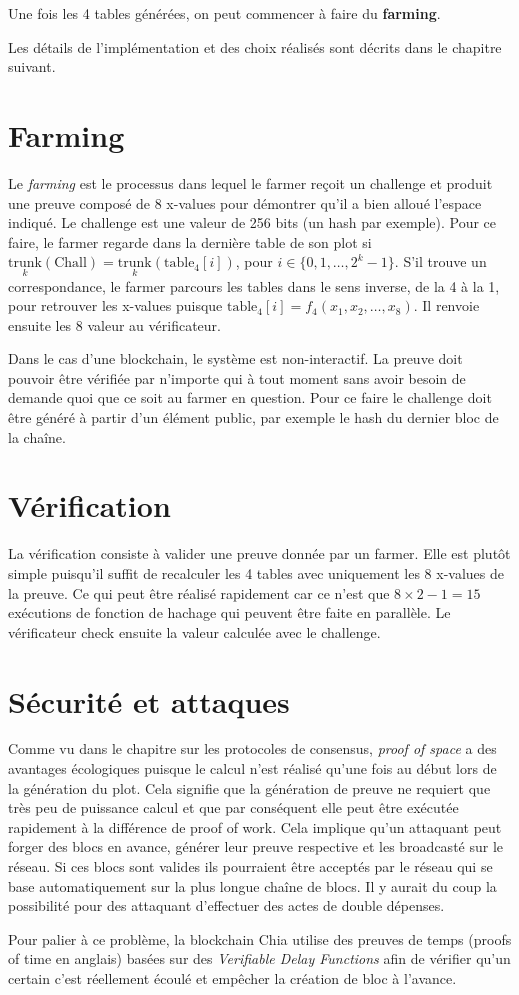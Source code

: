 \documentclass[../tb_report.tex]{subfiles}
\begin{document}
Une fois les 4 tables générées, on peut commencer à faire du \textbf{farming}.

Les détails de l'implémentation et des choix réalisés sont décrits dans le chapitre suivant.

\section{Farming}

Le \emph{farming} est le processus dans lequel le farmer reçoit un challenge et produit une preuve composé de 8 x-values pour démontrer qu'il a bien alloué l'espace indiqué. Le challenge est une valeur de 256 bits (un hash par exemple). Pour ce faire, le farmer regarde dans la dernière table de son plot si $\underset{k}{\mathrm{trunk}}(\mathrm{Chall})=\underset{k}{\mathrm{trunk}}(\mathrm{table_4}[i])$, pour $i \in \{0,1,\dots,2^k-1\}$. S'il trouve un correspondance, le farmer parcours les tables dans le sens inverse, de la 4 à la 1, pour retrouver les x-values puisque $\mathrm{table_4}[i]=f_4(x_1,x_2,\dots,x_8)$. Il renvoie ensuite les 8 valeur au vérificateur.

Dans le cas d'une blockchain, le système est non-interactif. La preuve doit pouvoir être vérifiée par n'importe qui à tout moment sans avoir besoin de demande quoi que ce soit au farmer en question. Pour ce faire le challenge doit être généré à partir d'un élément public, par exemple le hash du dernier bloc de la chaîne.

\section{Vérification}

La vérification consiste à valider une preuve donnée par un farmer. Elle est plutôt simple puisqu'il suffit de recalculer les 4 tables avec uniquement les 8 x-values de la preuve. Ce qui peut être réalisé rapidement car ce n'est que $8 \times 2 - 1 = 15$ exécutions de fonction de hachage qui peuvent être faite en parallèle. Le vérificateur check ensuite la valeur calculée avec le challenge.

\section{Sécurité et attaques}

Comme vu dans le chapitre sur les protocoles de consensus, \emph{proof of space} a des avantages écologiques puisque le calcul n'est réalisé qu'une fois au début lors de la génération du plot. Cela signifie que la génération de preuve ne requiert que très peu de puissance calcul et que par conséquent elle peut être exécutée rapidement à la différence de proof of work. Cela implique qu'un attaquant peut forger des blocs en avance, générer leur preuve respective et les broadcasté sur le réseau. Si ces blocs sont valides ils pourraient être acceptés par le réseau qui se base automatiquement sur la plus longue chaîne de blocs. Il y aurait du coup la possibilité pour des attaquant d'effectuer des actes de double dépenses.

Pour palier à ce problème, la blockchain Chia utilise des preuves de temps (proofs of time en anglais) basées sur des \emph{Verifiable Delay Functions} afin de vérifier qu'un certain c'est réellement écoulé et empêcher la création de bloc à l'avance.
\end{document}
